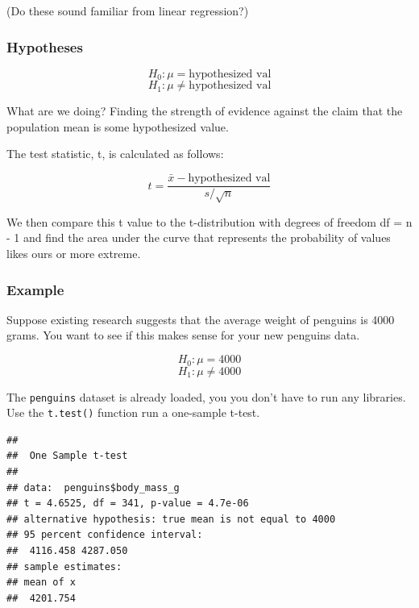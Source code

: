 \documentclass[
  openany]{book}
\newenvironment{Shaded}{\begin{snugshade}}{\end{snugshade}}
\newcommand{\AttributeTok}[1]{\textcolor[rgb]{0.77,0.63,0.00}{#1}}
\newcommand{\ConstantTok}[1]{\textcolor[rgb]{0.00,0.00,0.00}{#1}}
\newcommand{\DecValTok}[1]{\textcolor[rgb]{0.00,0.00,0.81}{#1}}
\newcommand{\FunctionTok}[1]{\textcolor[rgb]{0.00,0.00,0.00}{#1}}
\newcommand{\NormalTok}[1]{#1}
\newcommand{\SpecialCharTok}[1]{\textcolor[rgb]{0.00,0.00,0.00}{#1}}
\begin{document}
(Do these sound familiar from linear regression?)

\hypertarget{hypotheses}{%
\subsubsection{Hypotheses}\label{hypotheses}}

\[H_0: \mu = \text{hypothesized val}\]
\[H_1: \mu \ne \text{hypothesized val}\]

What are we doing? Finding the strength of evidence against the claim that the population mean is some hypothesized value.

The test statistic, t, is calculated as follows:

\[ t = \frac{\bar{x} - \text{hypothesized val}}{s/\sqrt{n}} \]

We then compare this t value to the t-distribution with degrees of freedom df = n - 1 and find the area under the curve that represents the probability of values likes ours or more extreme.

\hypertarget{example}{%
\subsubsection{Example}\label{example}}

Suppose existing research suggests that the average weight of penguins is 4000 grams. You want to see if this makes sense for your new penguins data.

\[H_0: \mu = 4000\]
\[H_1: \mu \ne 4000\]

The \texttt{penguins} dataset is already loaded, you you don't have to run any libraries. Use the \texttt{t.test()} function run a one-sample t-test.

\begin{Shaded}
\end{Shaded}

\begin{verbatim}
## 
##  One Sample t-test
## 
## data:  penguins$body_mass_g
## t = 4.6525, df = 341, p-value = 4.7e-06
## alternative hypothesis: true mean is not equal to 4000
## 95 percent confidence interval:
##  4116.458 4287.050
## sample estimates:
## mean of x 
##  4201.754
\end{verbatim}
\end{document}
